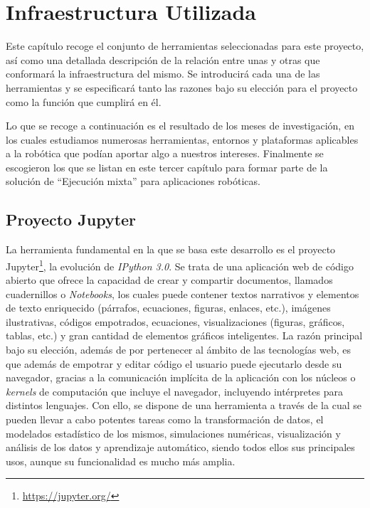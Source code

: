 \chapter{Infraestructura Utilizada}

Este capítulo recoge el conjunto de herramientas seleccionadas para este proyecto, así como una detallada descripción de la relación entre unas y otras que conformará la infraestructura del mismo.
Se introducirá cada una de las herramientas y se especificará tanto las razones bajo su elección para el proyecto como la función que cumplirá en él.

Lo que se recoge a continuación es el resultado de los meses de investigación, en los cuales estudiamos numerosas herramientas, entornos y plataformas aplicables a la robótica que podían aportar algo a nuestros intereses. Finalmente se escogieron los que se listan en este tercer capítulo para formar parte de la solución de ``Ejecución mixta'' para aplicaciones robóticas.

\section{Proyecto Jupyter}

La herramienta fundamental en la que se basa este desarrollo es el proyecto Jupyter\footnote{\url{https://jupyter.org/}}, la evolución de \textit{IPython 3.0}. Se trata de una aplicación web de código abierto que ofrece la capacidad de crear y compartir documentos, llamados cuadernillos o \textit{Notebooks}, los cuales puede contener textos narrativos y elementos de texto enriquecido (párrafos, ecuaciones, figuras, enlaces, etc.), imágenes ilustrativas, códigos empotrados, ecuaciones, visualizaciones (figuras, gráficos, tablas, etc.) y gran cantidad de elementos gráficos inteligentes. La razón principal bajo su elección, además de por pertenecer al ámbito de las tecnologías web, es que además de empotrar y editar código el usuario puede ejecutarlo desde su navegador, gracias a la comunicación implícita de la aplicación con los núcleos o \textit{kernels} de computación que incluye el navegador, incluyendo intérpretes para distintos lenguajes. Con ello, se dispone de una herramienta a través de la cual se pueden llevar a cabo potentes tareas como la transformación de datos, el modelados estadístico de los mismos, simulaciones numéricas, visualización y análisis de los datos y aprendizaje automático, siendo todos ellos sus principales usos, aunque su funcionalidad es mucho más amplia.

